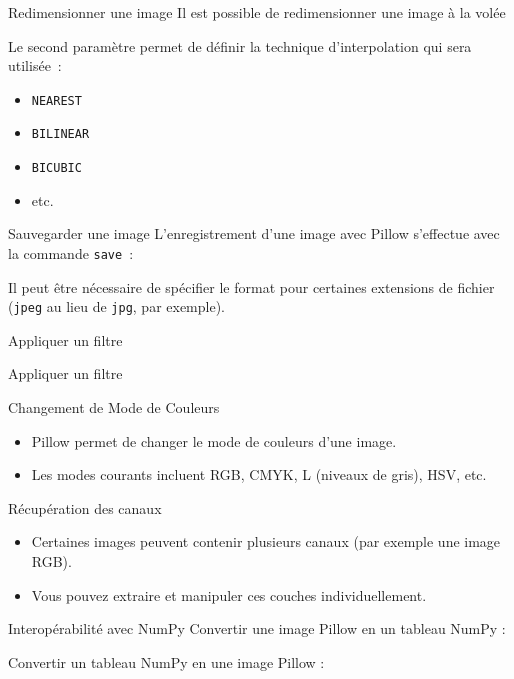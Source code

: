 \begin{frame}{Redimensionner une image}
    Il est possible de redimensionner une image à la volée

    Le second paramètre permet de définir la technique d'interpolation qui sera utilisée~:
    \begin{itemize}
        \item \texttt{NEAREST}
        \item \texttt{BILINEAR}
        \item \texttt{BICUBIC}
        \item etc.
    \end{itemize}
\end{frame}

\begin{frame}{Sauvegarder une image}
    L'enregistrement d'une image avec Pillow s'effectue avec la commande \texttt{save}~:
    
    Il peut être nécessaire de spécifier le format pour certaines extensions de fichier (\texttt{jpeg} au lieu de \texttt{jpg}, par exemple).
\end{frame}

\begin{frame}{Appliquer un filtre}
    
\end{frame}
\begin{frame}{Appliquer un filtre}
\end{frame}

\begin{frame}{Changement de Mode de Couleurs}
    \begin{itemize}
        \item Pillow permet de changer le mode de couleurs d'une image.
        \item Les modes courants incluent RGB, CMYK, L (niveaux de gris), HSV, etc.
    \end{itemize}

\end{frame}

\begin{frame}{Récupération des canaux}
    \begin{itemize}
        \item Certaines images peuvent contenir plusieurs canaux (par exemple une image RGB).
        \item Vous pouvez extraire et manipuler ces couches individuellement.
    \end{itemize}
\end{frame}

\begin{frame}{Interopérabilité avec NumPy}
    Convertir une image Pillow en un tableau NumPy :


    Convertir un tableau NumPy en une image Pillow :

\end{frame}
